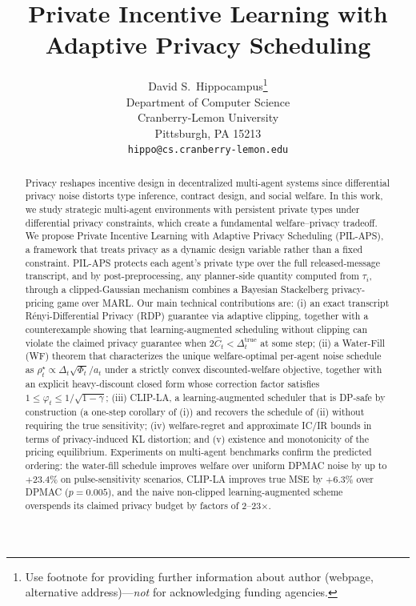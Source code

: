 \documentclass{article}
\title{Private Incentive Learning with Adaptive Privacy Scheduling}
\author{%
  David S.~Hippocampus\thanks{Use footnote for providing further information
    about author (webpage, alternative address)---\emph{not} for acknowledging
    funding agencies.} \\
  Department of Computer Science\\
  Cranberry-Lemon University\\
  Pittsburgh, PA 15213 \\
  \texttt{hippo@cs.cranberry-lemon.edu} \\
}
\begin{document}
\maketitle


\begin{abstract}

Privacy reshapes incentive design in decentralized multi-agent systems since differential privacy noise distorts type inference, contract design, and social welfare. In this work, we study strategic multi-agent environments with persistent private types under differential privacy constraints, which create a fundamental welfare–privacy tradeoff. We propose Private Incentive Learning with Adaptive Privacy Scheduling (PIL-APS), a framework that treats privacy as a dynamic design variable rather than a fixed constraint. PIL-APS protects each agent’s private type over the full released-message transcript, and by post-preprocessing, any planner-side quantity computed from $\tau_i$, through a clipped-Gaussian mechanism combines a Bayesian Stackelberg privacy-pricing game over MARL. Our main technical contributions are: (i) an exact transcript Rényi-Differential Privacy (RDP) guarantee via adaptive clipping, together with a counterexample showing that learning-augmented scheduling without clipping can violate the claimed privacy guarantee when $2\hat C_t < \Delta_t^{\mathrm{true}}$ at some step; (ii) a Water-Fill (WF) theorem that characterizes the unique welfare-optimal per-agent noise schedule as $\rho_t^\star \propto \Delta_t \sqrt{\Phi_t}/a_t$ under a strictly convex discounted-welfare objective, together with an explicit heavy-discount closed form whose correction factor satisfies $1 \le \varphi_t \le 1/\sqrt{1-\gamma}$; (iii) CLIP-LA, a learning-augmented scheduler that is DP-safe by construction (a one-step corollary of (i)) and recovers the schedule of (ii) without requiring the true sensitivity; (iv) welfare-regret and approximate IC/IR bounds in terms of privacy-induced KL distortion; and (v) existence and monotonicity of the pricing equilibrium. Experiments on multi-agent benchmarks confirm the predicted ordering: the water-fill schedule improves welfare over uniform DPMAC noise by up to $+23.4\%$ on pulse-sensitivity scenarios, CLIP-LA improves true MSE by $+6.3\%$ over DPMAC ($p = 0.005$), and the naive non-clipped learning-augmented scheme overspends its claimed privacy budget by factors of 2–23$\times$.
 


\end{abstract}
\end{document}
